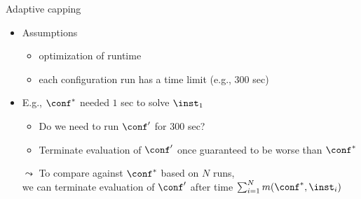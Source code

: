 \begin{frame}[c,fragile]{Adaptive capping}

\begin{itemize}
\item Assumptions
\begin{itemize} 
\item optimization of runtime
\item each configuration run has a time limit (e.g., $300$ sec)
\end{itemize}
\pause    

\item E.g., $\conf^*$ needed $1$ sec to solve $\inst_1$
\begin{itemize}
\item Do we need to run $\conf'$ for $300$ sec?
\item Terminate evaluation of $\conf'$ once guaranteed to be worse than $\conf^*$
\end{itemize}
\pause
\bigskip    
\item[$\leadsto$] To compare against $\conf^*$ based on $N$ runs,\\we can terminate evaluation of $\conf'$ after time $\sum_{i=1}^N m(\conf^*,\inst_i)$
\end{itemize}

\end{frame}
